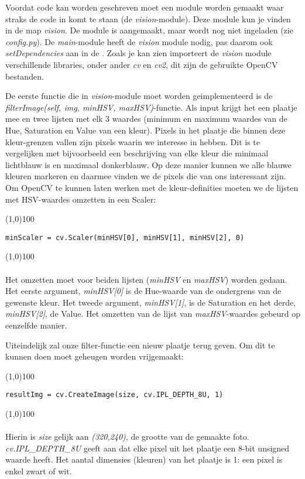 \documentclass[a4paper]{article}
\begin{document}
Voordat code kan worden geschreven moet een module worden gemaakt waar straks de code in komt te staan (de \textit{vision}-module). Deze module kun je vinden in de map \textit{vision}. De module is aangemaakt, maar wordt nog niet ingeladen (zie \textit{config.py}). De \textit{main}-module heeft de \textit{vision} module nodig, pas daarom ook \textit{setDependencies} aan in de .
Zoals je kan zien importeert de \textit{vision} module verschillende libraries, onder ander \textit{cv} en \textit{cv2}, dit zijn de gebruikte OpenCV bestanden.

De eerste functie die in \textit{vision}-module moet worden geimplementeerd is de \textit{filterImage(self, img, minHSV, maxHSV)}-functie.
Als input krijgt het een plaatje mee en twee lijsten met elk 3 waardes (minimum en maximum waardes van de Hue, Saturation en Value van een kleur). Pixels in het plaatje die binnen deze kleur-grenzen vallen zijn pixels waarin we interesse in hebben. Dit is te vergelijken met bijvoorbeeld een beschrijving van elke kleur die minimaal lichtblauw is en maximaal donkerblauw. Op deze manier kunnen we alle blauwe kleuren markeren en daarmee vinden we de pixels die van ons interessant zijn.
Om OpenCV te kunnen laten werken met de kleur-definities moeten we de lijsten met HSV-waardes omzetten in een Scaler:

\noindent \line(1,0){100}
\begin{verbatim}
minScaler = cv.Scaler(minHSV[0], minHSV[1], minHSV[2], 0)
\end{verbatim}
\noindent \line(1,0){100}
\\\\
Het omzetten moet voor beiden lijsten (\textit{minHSV} en \textit{maxHSV}) worden gedaan. Het eerste argument, \textit{minHSV[0]} is de Hue-waarde van de ondergrens van de gewenste kleur. Het tweede argument, \textit{minHSV[1]}, is de Saturation en het derde, \textit{minHSV[2]}, de Value. Het omzetten van de lijst van \textit{maxHSV}-waardes gebeurd op eenzelfde manier.

Uiteindelijk zal onze filter-functie een nieuw plaatje terug geven. Om dit te kunnen doen moet geheugen worden vrijgemaakt:

\noindent \line(1,0){100}
\begin{verbatim}
resultImg = cv.CreateImage(size, cv.IPL_DEPTH_8U, 1)
\end{verbatim}
\noindent \line(1,0){100}
\\\\
Hierin is \textit{size} gelijk aan \textit{(320,240)}, de grootte van de gemaakte foto. \textit{cv.IPL\_DEPTH\_8U} geeft aan dat elke pixel uit het plaatje een 8-bit unsigned waarde heeft. Het aantal dimensies (kleuren) van het plaatje is 1: een pixel is enkel zwart of wit.
\end{document}
